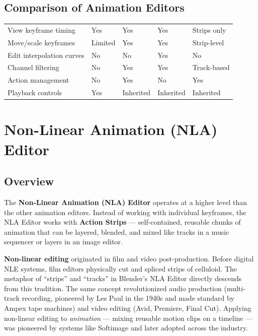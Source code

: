 \subsection{Comparison of Animation Editors}

\begin{center}
\begin{tabularx}{\textwidth}{L{3.5cm}C{1.8cm}C{1.8cm}C{2cm}C{1.8cm}}
\toprule
{}
 &  &  &  &  \\
\midrule
View keyframe timing & Yes & Yes & Yes & Strips only \\
Move/scale keyframes & Limited & Yes & Yes & Strip-level \\
Edit interpolation curves & No & No & Yes & No \\
Channel filtering & No & Yes & Yes & Track-based \\
Action management & No & Yes & No & Yes \\
Playback controls & Yes & Inherited & Inherited & Inherited \\
\bottomrule
\end{tabularx}
\end{center}


\section{Non-Linear Animation (NLA) Editor}
\label{sec:nla}

\subsection{Overview}

The \textbf{Non-Linear Animation (NLA) Editor} operates at a higher level than the other animation editors. Instead of working with individual keyframes, the NLA Editor works with \textbf{Action Strips} --- self-contained, reusable chunks of animation that can be layered, blended, and mixed like tracks in a music sequencer or layers in an image editor.

\begin{historynote}
\textbf{Non-linear editing} originated in film and video post-production. Before digital NLE systems, film editors physically cut and spliced strips of celluloid. The metaphor of ``strips'' and ``tracks'' in Blender's NLA Editor directly descends from this tradition. The same concept revolutionized audio production (multi-track recording, pioneered by Les Paul in the 1940s and made standard by Ampex tape machines) and video editing (Avid, Premiere, Final Cut). Applying non-linear editing to \textit{animation} --- mixing reusable motion clips on a timeline --- was pioneered by systems like Softimage and later adopted across the industry.
\end{historynote}

